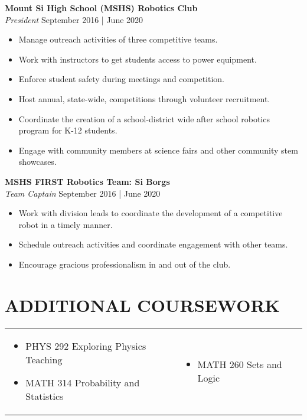\documentclass[a4paper,9pt]{extarticle}
\begin{document}
\noindent\textbf{Mount Si High School (MSHS) Robotics Club}\\
\textit{President} \hfill September 2016 | June 2020
\begin{itemize}
    \item Manage outreach activities of three competitive teams.
    \item Work with instructors to get students access to power equipment.
    \item Enforce student safety during meetings and competition.
    \item Host annual, state-wide, competitions through volunteer recruitment.
    \item Coordinate the creation of a school-district wide after school robotics program for K-12 students.
    \item Engage with community members at science fairs and other community stem showcases.
\end{itemize}

\noindent\textbf{MSHS FIRST Robotics Team: Si Borgs}\\
\textit{Team Captain} \hfill September 2016 | June 2020
\begin{itemize}
    \item Work with division leads to coordinate the development of a competitive robot in a timely manner.
    \item Schedule outreach activities and coordinate engagement with other teams.
    \item Encourage gracious professionalism in and out of the club.
\end{itemize}


\section*{ADDITIONAL COURSEWORK}
\begin{tabularx}{1\textwidth}{>{\raggedright\arraybackslash}X >{\raggedright\arraybackslash}X }
    \vspace{-0.2in}
    \begin{itemize}
        \item PHYS 292 Exploring Physics Teaching
        \item MATH 314 Probability and Statistics
    \end{itemize}
    & \vspace{-0.2in} \begin{itemize}
        \item MATH 260 Sets and Logic
    \end{itemize}
\end{tabularx}
\end{document}
